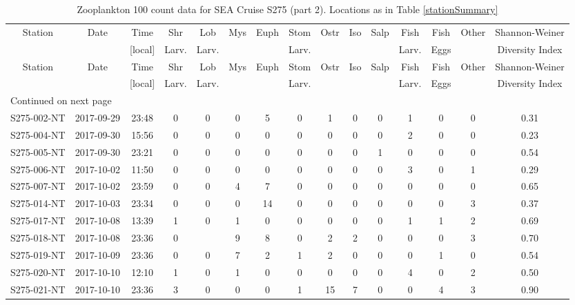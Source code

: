 \begin{longtable}{ccccccccccccccc}
\caption{\label{100count2} Zooplankton 100 count data for SEA Cruise S275 (part 2). Locations as in Table \ref{stationSummary}} \\ 
 Station & Date & Time & Shr & Lob & Mys & Euph & Stom & Ostr & Iso & Salp & Fish & Fish & Other & Shannon-Weiner \\ 
   &  & [local] & Larv. & Larv. &  &  & Larv. &  &  &  & Larv. & Eggs &  & Diversity Index \\ 
\hline\n\endfirsthead
Station & Date & Time & Shr & Lob & Mys & Euph & Stom & Ostr & Iso & Salp & Fish & Fish & Other & Shannon-Weiner \\ 
 &  & [local] & Larv. & Larv. &  &  & Larv. &  &  &  & Larv. & Eggs &  & Diversity Index \\ 
\hline
\endhead
\hline
\multicolumn{15}{l}{\footnotesize Continued on next page}
\endfoot
\endlastfoot
 \hline
S275-001-NT & 2017-09-29 & 12:34 & 2 & 0 & 0 & 0 & 0 & 0 & 0 & 0 & 1 & 1 & 14 & 0.48 \\ 
  S275-002-NT & 2017-09-29 & 23:48 & 0 & 0 & 0 & 5 & 0 & 1 & 0 & 0 & 1 & 0 & 0 & 0.31 \\ 
  S275-004-NT & 2017-09-30 & 15:56 & 0 & 0 & 0 & 0 & 0 & 0 & 0 & 0 & 2 & 0 & 0 & 0.23 \\ 
  S275-005-NT & 2017-09-30 & 23:21 & 0 & 0 & 0 & 0 & 0 & 0 & 0 & 1 & 0 & 0 & 0 & 0.54 \\ 
  S275-006-NT & 2017-10-02 & 11:50 & 0 & 0 & 0 & 0 & 0 & 0 & 0 & 0 & 3 & 0 & 1 & 0.29 \\ 
  S275-007-NT & 2017-10-02 & 23:59 & 0 & 0 & 4 & 7 & 0 & 0 & 0 & 0 & 0 & 0 & 0 & 0.65 \\ 
  S275-014-NT & 2017-10-03 & 23:34 & 0 & 0 & 0 & 14 & 0 & 0 & 0 & 0 & 0 & 0 & 3 & 0.37 \\ 
  S275-017-NT & 2017-10-08 & 13:39 & 1 & 0 & 1 & 0 & 0 & 0 & 0 & 0 & 1 & 1 & 2 & 0.69 \\ 
  S275-018-NT & 2017-10-08 & 23:36 & 0 &  & 9 & 8 & 0 & 2 & 2 & 0 & 0 & 0 & 3 & 0.70 \\ 
  S275-019-NT & 2017-10-09 & 23:36 & 0 & 0 & 7 & 2 & 1 & 2 & 0 & 0 & 0 & 1 & 0 & 0.54 \\ 
  S275-020-NT & 2017-10-10 & 12:10 & 1 & 0 & 1 & 0 & 0 & 0 & 0 & 0 & 4 & 0 & 2 & 0.50 \\ 
  S275-021-NT & 2017-10-10 & 23:36 & 3 & 0 & 0 & 0 & 1 & 15 & 7 & 0 & 0 & 4 & 3 & 0.90 \\ 

\end{longtable}
